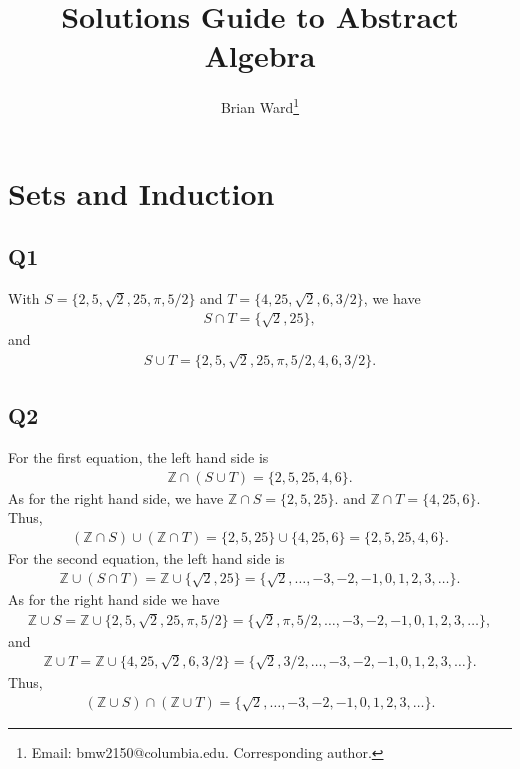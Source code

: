 \documentclass[12pt]{article}
\numberwithin{theorem}{section}
\numberwithin{equation}{section}
\numberwithin{remark}{section}
\numberwithin{definition}{section}
\numberwithin{theorem}{section}
\numberwithin{lemma}{section}
\numberwithin{example}{section}
\begin{document}
\title{Solutions Guide to Abstract Algebra}
\author{Brian Ward\thanks{Email: {bmw2150@columbia.edu}. Corresponding author. }} 
\maketitle
{}

\tableofcontents

\setcounter{section}{-1}

\section{Sets and Induction}



\subsection{Q1}
With $S = \{2,5,\sqrt{2},25,\pi,5/2\}$ and $T=\{4,25,\sqrt{2},6,3/2\}$, we have 
\begin{align*}
	S\cap T = \{\sqrt{2},25\},
\end{align*}
and 
\begin{align*}
	S\cup T = \{2,5,\sqrt{2},25,\pi,5/2,4,6,3/2\}.
\end{align*}



\subsection{Q2}
For the first equation, the left hand side is
\begin{align*}
	\mathbb{Z} \cap \left(S\cup T \right) = \{2,5,25,4,6\}.
\end{align*}
As for the right hand side, we have $\mathbb{Z}\cap S = \{2,5,25\}$. and $\mathbb{Z}\cap T = \{4,25,6\}$. Thus, 
\begin{align*}
	\left(\mathbb{Z}\cap S\right)\cup\left(\mathbb{Z}\cap T\right) = \{2,5,25\} \cup \{4,25,6\} = \{2,5,25,4,6\}.
\end{align*}
For the second equation, the left hand side is
\begin{align*}
	\mathbb{Z} \cup \left(S\cap T \right) = \mathbb{Z} \cup \{\sqrt{2},25\} = \{\sqrt{2},\ldots,-3,-2,-1,0,1,2,3,\ldots\}.
\end{align*}
As for the right hand side we have 
\begin{align*}
	\mathbb{Z} \cup S = \mathbb{Z} \cup  \{2,5,\sqrt{2},25,\pi,5/2\} = \{\sqrt{2},\pi,5/2,\ldots,-3,-2,-1,0,1,2,3,\ldots\},
\end{align*}
and
\begin{align*}
	\mathbb{Z} \cup T = \mathbb{Z} \cup \{4,25,\sqrt{2},6,3/2\} = \{\sqrt{2},3/2,\ldots,-3,-2,-1,0,1,2,3,\ldots\}.
\end{align*}
Thus,
\begin{align*}
	\left(\mathbb{Z}\cup S\right)\cap\left(\mathbb{Z}\cup T\right) = \{\sqrt{2},\ldots,-3,-2,-1,0,1,2,3,\ldots\}.
\end{align*}
\end{document}
